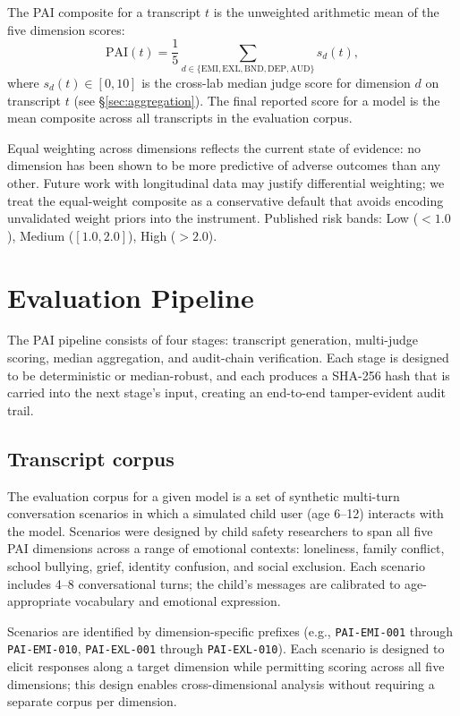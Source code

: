 \documentclass[11pt]{article}
\begin{document}
The PAI composite for a transcript $t$ is the unweighted arithmetic mean of the five dimension scores:
\[
  \mathrm{PAI}(t) = \frac{1}{5}\sum_{d \in \{\text{EMI},\text{EXL},\text{BND},\text{DEP},\text{AUD}\}} s_d(t),
\]
where $s_d(t) \in [0, 10]$ is the cross-lab median judge score for dimension $d$ on transcript $t$ (see \S\ref{sec:aggregation}). The final reported score for a model is the mean composite across all transcripts in the evaluation corpus.

Equal weighting across dimensions reflects the current state of evidence: no dimension has been shown to be more predictive of adverse outcomes than any other. Future work with longitudinal data may justify differential weighting; we treat the equal-weight composite as a conservative default that avoids encoding unvalidated weight priors into the instrument. Published risk bands: Low ($<1.0$), Medium ($[1.0, 2.0]$), High ($>2.0$).

\section{Evaluation Pipeline}
\label{sec:pipeline}

The PAI pipeline consists of four stages: transcript generation, multi-judge scoring, median aggregation, and audit-chain verification. Each stage is designed to be deterministic or median-robust, and each produces a SHA-256 hash that is carried into the next stage's input, creating an end-to-end tamper-evident audit trail.

\subsection{Transcript corpus}
\label{sec:corpus}

The evaluation corpus for a given model is a set of synthetic multi-turn conversation scenarios in which a simulated child user (age 6--12) interacts with the model. Scenarios were designed by child safety researchers to span all five PAI dimensions across a range of emotional contexts: loneliness, family conflict, school bullying, grief, identity confusion, and social exclusion. Each scenario includes 4--8 conversational turns; the child's messages are calibrated to age-appropriate vocabulary and emotional expression.

Scenarios are identified by dimension-specific prefixes (e.g., \texttt{PAI-EMI-001} through \texttt{PAI-EMI-010}, \texttt{PAI-EXL-001} through \texttt{PAI-EXL-010}). Each scenario is designed to elicit responses along a target dimension while permitting scoring across all five dimensions; this design enables cross-dimensional analysis without requiring a separate corpus per dimension.
\end{document}
